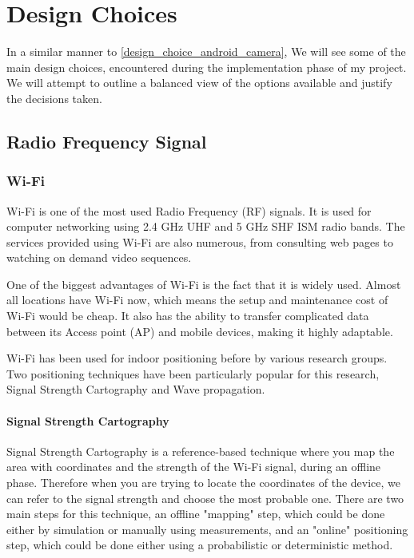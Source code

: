 

\section{Design Choices}
In a similar manner to \ref{design_choice_android_camera}, We will see some of the main design choices, encountered during the implementation phase of my project. We will attempt to outline a balanced view of the options available and justify the decisions taken.
\subsection{Radio Frequency Signal}

\subsubsection{Wi-Fi}

Wi-Fi is one of the most used Radio Frequency (RF) signals.
It is used for computer networking using 2.4 GHz UHF and 5 GHz SHF
ISM radio bands\cite{wifi-wikipedia}. The services provided using Wi-Fi are also
numerous, from consulting web pages to watching on demand video sequences. 

One of the biggest advantages of Wi-Fi is the fact that it is
widely used. Almost all locations have Wi-Fi now, which means the setup and maintenance cost of Wi-Fi would be cheap. It also has the
ability to transfer complicated data between its Access point (AP)
and mobile devices, making it highly adaptable. 

Wi-Fi has been used for indoor positioning before by various research
groups\cite{wifi-indoor}. Two positioning techniques have been particularly popular for this research, Signal Strength Cartography and Wave propagation. 

\paragraph{Signal Strength Cartography}
Signal Strength Cartography\cite{sig-cart} is a reference-based technique where you map the area
with coordinates and the strength of the Wi-Fi signal, during an offline phase. Therefore when you
are trying to locate the coordinates of the device, we can refer to the signal strength and choose the most probable one. There are two main steps
for this technique, an offline "mapping" step, which could be done either
by simulation or manually using measurements, and an "online" positioning
step, which could be done either using a probabilistic or deterministic
method. 

